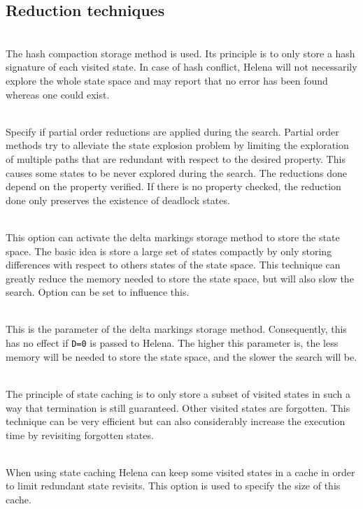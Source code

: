 \subsection{Reduction techniques}
\begin{description}
\item{}\\ The hash compaction storage
  method is used.  Its principle is to only store a hash signature of
  each visited state.  In case of hash conflict, Helena will not
  necessarily explore the whole state space and may report that no
  error has been found whereas one could exist.
\item{}\\ Specify if partial order
  reductions are applied during the search.  Partial order methods try
  to alleviate the state explosion problem by limiting the exploration
  of multiple paths that are redundant with respect to the desired
  property.  This causes some states to be never explored during the
  search.  The reductions done depend on the property verified.  If
  there is no property checked, the reduction done only preserves the
  existence of deadlock states.
\item{}\\ This option can activate the delta
  markings storage method to store the state space. The basic idea is
  store a large set of states compactly by only storing differences
  with respect to others states of the state space. This technique can
  greatly reduce the memory needed to store the state space, but will
  also slow the search. Option  can be set to influence
  this.
\item{}\\ This is the parameter of the
  delta markings storage method. Consequently, this has no effect if
  \texttt{D=0} is passed to Helena. The higher this parameter is, the
  less memory will be needed to store the state space, and the slower
  the search will be.
\item{}\\ The principle of state caching is
  to only store a subset of visited states in such a way that
  termination is still guaranteed.  Other visited states are
  forgotten.  This technique can be very efficient but can also
  considerably increase the execution time by revisiting forgotten
  states.
\item{}\\ When using state caching Helena
  can keep some visited states in a cache in order to limit redundant
  state revisits.  This option is used to specify the size of this
  cache.
\end{description}

